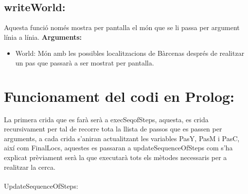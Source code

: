 \documentclass[11pt]{article}
\begin{document}
\subsection{writeWorld:}
Aquesta funció només mostra per pantalla el món que se li passa per argument línia a línia.
\textbf{Arguments:}
\begin{itemize}
\item World: Món amb les possibles localitzacions de Bàrcenas després de realitzar un pas que passarà a ser mostrat per pantalla.
\end{itemize}
\newpage
\section{Funcionament del codi en Prolog:}
La primera crida que es farà serà a execSeqofSteps, aquesta, es crida recursivament per tal de recorre tota la llista de passos que es passen per arguments, a cada crida s'aniran actualitzant les variables PasY, PasM i PasC, així com FinalLocs, aquestes es passaran a updateSequenceOfSteps com s'ha explicat prèviament serà la que executarà tots els mètodes necessaris per a realitzar la cerca.\\\\
UpdateSequenceOfSteps:
\end{document}
